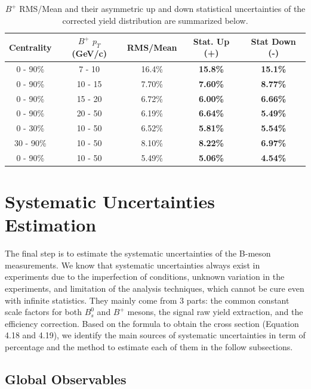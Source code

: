 \begin{table}[h]
\begin{center}
\caption{$B^+$ RMS/Mean and their asymmetric up and down statistical uncertainties of the corrected yield distribution are summarized below.}
\vspace{1em}
\label{BPStatErr}
  \begin{tabular}{| c | c |c | c| c|}
    \hline
     Centrality & $B^+$ $p_T$ (GeV/c) & RMS/Mean  & Stat. Up (+) & Stat Down (-)  \\
    \hline
    \hline
0 - 90\% & 7 - 10 &  16.4\%  &  \textbf{15.8\%}  & \textbf{15.1\%}   \\ 
0 - 90\% & 10 - 15 &  7.70\%   &  \textbf{7.60\%}  & \textbf{8.77\%}   \\ 
0 - 90\% & 15 - 20 &   6.72\%   &  \textbf{6.00\%}  & \textbf{6.66\%}   \\ 
0 - 90\% & 20 - 50 &  6.19\%    &  \textbf{6.64\%}  & \textbf{5.49\%}   \\ 
0 - 30\% & 10 - 50 &   6.52\% &  \textbf{5.81\%}  & \textbf{5.54\%}   \\ 
30 - 90\% & 10 - 50 & 8.10\%  &  \textbf{8.22\%}  & \textbf{6.97\%}   \\ 
0 - 90\% & 10 - 50 & 5.49\%  &  \textbf{5.06\%}  & \textbf{4.54\%}    \\ 
    \hline
    \hline
\end{tabular}
\end{center}
\end{table}


\section{Systematic Uncertainties Estimation} 

The final step is to estimate the systematic uncertainties of the B-meson measurements. We know that systematic uncertainties always exist in experiments due to the imperfection of conditions, unknown variation in the experiments, and limitation of the analysis techniques, which cannot be cure even with infinite statistics. They mainly come from 3 parts: the common constant scale factors for both $B^0_s$ and $B^{+}$ mesons, the signal raw yield extraction, and the efficiency correction. Based on the formula to obtain the cross section (Equation 4.18 and 4.19), we identify the main sources of systematic uncertainties in term of percentage and the method to estimate each of them in the follow subsections.  

\subsection{Global Observables}

